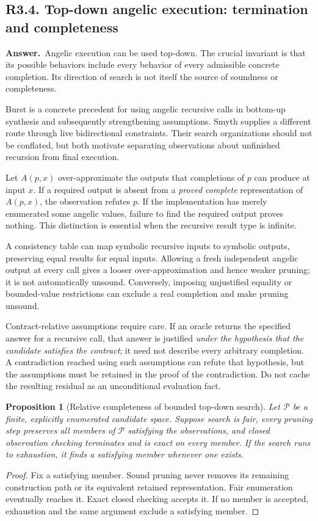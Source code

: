 \documentclass[11pt,a4paper]{article}
\newcommand{\qid}[3]{\subsection{#2. #3}\label{#1}}
\newcommand{\answer}{\noindent\textbf{Answer.}\ }
\newtheorem{proposition}{Proposition}[section]
\theoremstyle{remark}
\begin{document}
\qid{q34}{R3.4}{Top-down angelic execution: termination and completeness}
\answer Angelic execution can be used top-down. The crucial invariant is that its possible behaviors include every behavior of every admissible concrete completion. Its direction of search is not itself the source of soundness or completeness.

Burst is a concrete precedent for using angelic recursive calls in bottom-up synthesis and subsequently strengthening assumptions. Smyth supplies a different route through live bidirectional constraints. Their search organizations should not be conflated, but both motivate separating observations about unfinished recursion from final execution.~\cite{burst,smyth}

Let $A(p,x)$ over-approximate the outputs that completions of $p$ can produce at input $x$. If a required output is absent from a \emph{proved complete} representation of $A(p,x)$, the observation refutes $p$. If the implementation has merely enumerated some angelic values, failure to find the required output proves nothing. This distinction is essential when the recursive result type is infinite.

A consistency table can map symbolic recursive inputs to symbolic outputs, preserving equal results for equal inputs. Allowing a fresh independent angelic output at every call gives a looser over-approximation and hence weaker pruning; it is not automatically unsound. Conversely, imposing unjustified equality or bounded-value restrictions can exclude a real completion and make pruning unsound.

Contract-relative assumptions require care. If an oracle returns the specified answer for a recursive call, that answer is justified \emph{under the hypothesis that the candidate satisfies the contract}; it need not describe every arbitrary completion. A contradiction reached using such assumptions can refute that hypothesis, but the assumptions must be retained in the proof of the contradiction. Do not cache the resulting residual as an unconditional evaluation fact.

\begin{proposition}[Relative completeness of bounded top-down search]\label{prop:bounded}
Let $\mathcal P$ be a finite, explicitly enumerated candidate space. Suppose search is fair, every pruning step preserves all members of $\mathcal P$ satisfying the observations, and closed observation checking terminates and is exact on every member. If the search runs to exhaustion, it finds a satisfying member whenever one exists.
\end{proposition}
\begin{proof}
Fix a satisfying member. Sound pruning never removes its remaining construction path or its equivalent retained representation. Fair enumeration eventually reaches it. Exact closed checking accepts it. If no member is accepted, exhaustion and the same argument exclude a satisfying member.
\end{proof}
\end{document}
